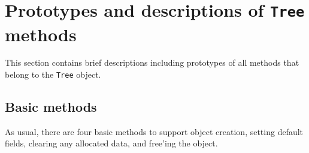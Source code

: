 \par
\section{Prototypes and descriptions of {\tt Tree} methods}
\label{section:Tree:proto}
\par
This section contains brief descriptions including prototypes
of all methods that belong to the {\tt Tree} object.
\par
\subsection{Basic methods}
\label{subsection:Tree:proto:basics}
\par
As usual, there are four basic methods to support object creation,
setting default fields, clearing any allocated data, and free'ing
the object.
\par
